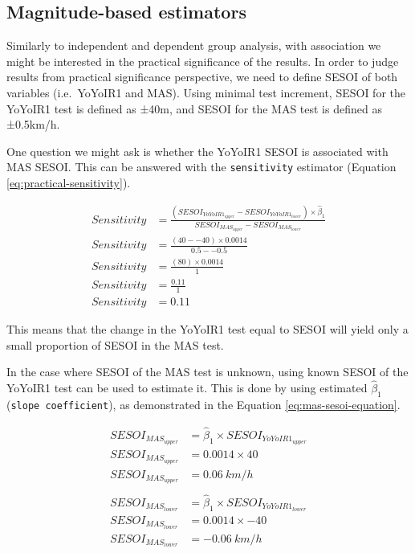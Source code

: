 \documentclass[
]{book}
\begin{document}
\hypertarget{magnitude-based-estimators}{%
\subsection{Magnitude-based estimators}\label{magnitude-based-estimators}}

Similarly to independent and dependent group analysis, with association we might be interested in the practical significance of the results. In order to judge results from practical significance perspective, we need to define SESOI of both variables (i.e.~YoYoIR1 and MAS). Using minimal test increment, SESOI for the YoYoIR1 test is defined as ±40m, and SESOI for the MAS test is defined as ±0.5km/h.

One question we might ask is whether the YoYoIR1 SESOI is associated with MAS SESOI. This can be answered with the \texttt{sensitivity} estimator (Equation \eqref{eq:practical-sensitivity}).

\begin{equation}
  \begin{split}
    Sensitivity &= \frac{(SESOI_{YoYoIR1_{upper}} - SESOI_{YoYoIR1_{lower}})\times\hat{\beta}_1}{SESOI_{MAS_{upper}}-SESOI_{MAS_{lower}}} \\
    Sensitivity &= \frac{(40 - -40)\times 0.0014}{0.5--0.5} \\
    Sensitivity &= \frac{(80)\times 0.0014}{1} \\
    Sensitivity &= \frac{0.11}{1} \\
    Sensitivity &= 0.11
  \end{split}
  \label{eq:practical-sensitivity}
\end{equation}

This means that the change in the YoYoIR1 test equal to SESOI will yield only a small proportion of SESOI in the MAS test.

In the case where SESOI of the MAS test is unknown, using known SESOI of the YoYoIR1 test can be used to estimate it. This is done by using estimated \(\hat{\beta}_1\) (\texttt{slope\ coefficient}), as demonstrated in the Equation \eqref{eq:mas-sesoi-equation}.

\begin{equation}
  \begin{split}
    SESOI_{MAS_{upper}} &= \hat{\beta}_1\times SESOI_{YoYoIR1_{upper}} \\
    SESOI_{MAS_{upper}} &= 0.0014\times 40 \\
    SESOI_{MAS_{upper}} &= 0.06 \: km/h \\
    \\
    SESOI_{MAS_{lower}} &= \hat{\beta}_1\times SESOI_{YoYoIR1_{lower}} \\
    SESOI_{MAS_{lower}} &= 0.0014\times -40 \\
    SESOI_{MAS_{lower}} &= -0.06 \: km/h
    \end{split}  
    \label{eq:mas-sesoi-equation}
\end{equation}
\end{document}
